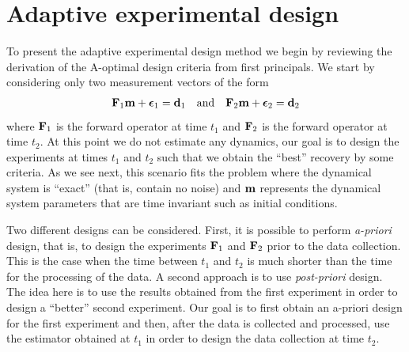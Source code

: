 \documentclass[11pt]{article}
\newcommand{\bfF}	{{\bf{F}}}
\newcommand{\bfd}	{{\bf{d}}}
\newcommand{\bfm}	{{\bf{m}}}
\newcommand{\bfepsilon} {{\boldsymbol \epsilon}}
\begin{document}
\section{ Adaptive experimental design }
\label{sec: Adaptive}

To present the adaptive experimental design method we begin by reviewing the derivation of the A-optimal
 design criteria from first principals. We start by considering only two measurement vectors  of the form
\begin{eqnarray}
\label{data}
\bfF_{1} \bfm + \bfepsilon_1 = \bfd_{1}\quad {\rm and} \quad \bfF_{2} \bfm + \bfepsilon_2 = \bfd_{2}
\end{eqnarray}
where $\bfF_{1}$ is the forward operator at time $t_{1}$ and $\bfF_{2}$ is the forward operator 
at time $t_{2}$. At this point we do not estimate any dynamics,
our goal is to design the experiments at times $t_{1}$ and $t_{2}$ such that we obtain the ``best''
recovery by some criteria.
As we see next, this scenario fits the problem where the dynamical system is ``exact'' (that is, contain
no noise) and $\bfm$ represents the dynamical system parameters that are time invariant such as initial conditions.

Two different designs can be considered. First, it is possible to perform {\em a-priori} design, that is,
to design the experiments $\bfF_{1}$ and $\bfF_{2}$ prior to the data collection. This is the case
when the time between $t_{1}$ and $t_{2}$ is much shorter than the time for the processing
of the data. A second approach is to use {\em post-priori} design. The idea here is to use the 
results obtained from the first experiment in order to design a ``better'' second experiment.
Our goal is to first obtain an a-priori design for the first experiment
and then, after the data is collected and processed, use the estimator
obtained at $t_{1}$ in order  to design the data collection
at time $t_{2}$.
\end{document}

